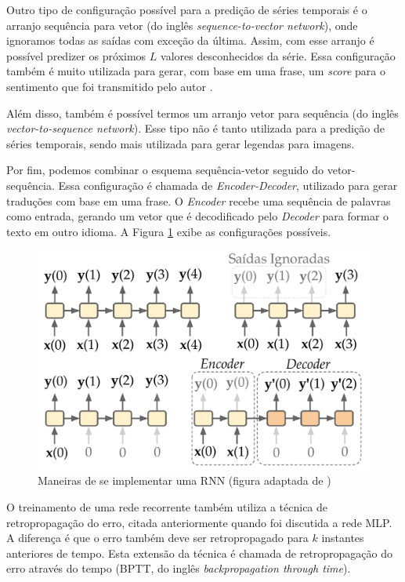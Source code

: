 \documentclass[a4paper, 12pt]{article}
\begin{document}
Outro tipo de configuração possível para a predição de séries temporais é o arranjo sequência para vetor (do inglês \textit{sequence-to-vector network}), onde ignoramos todas as saídas com exceção da última. Assim, com esse arranjo é possível predizer os próximos $L$ valores desconhecidos da série. Essa configuração também é muito utilizada para gerar, com base em uma frase, um \textit{score} para o sentimento que foi transmitido pelo autor \cite{geron2019hands}.

Além disso, também é possível termos um arranjo vetor para sequência (do inglês \textit{vector-to-sequence network}). Esse tipo não é tanto utilizada para a predição de séries temporais, sendo mais utilizada para gerar legendas para imagens. 

Por fim, podemos combinar o esquema sequência-vetor seguido do vetor-sequência. Essa configuração é chamada de \textit{Encoder-Decoder}, utilizado para gerar traduções com base em uma frase. O \textit{Encoder} recebe uma sequência de palavras como entrada, gerando um vetor que é decodificado pelo \textit{Decoder} para formar o texto em outro idioma. A Figura \ref{fig:rnn-output-style} exibe as configurações possíveis.
\begin{figure}[!ht]
\centering
\includegraphics[scale = 0.3]{rnn-output-style.pdf}
\caption{Maneiras de se implementar uma RNN (figura adaptada de \cite{geron2019hands})}
\label{fig:rnn-output-style}
\end{figure}

O treinamento de uma rede recorrente também utiliza a técnica de retropropagação do erro, citada anteriormente quando foi discutida a rede MLP. A diferença é que o erro também deve ser retropropagado para $k$ instantes anteriores de tempo. Esta extensão da técnica é chamada de retropropagação do erro através do tempo (BPTT, do inglês \textit{backpropagation through time}).
\end{document}
